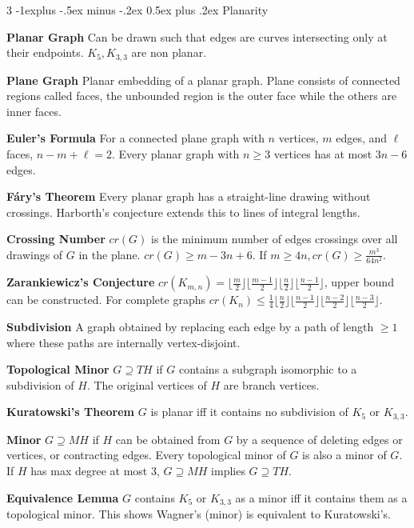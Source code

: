 \documentclass[10pt, landscape]{article}
\makeatletter
\renewcommand{\section}{\@startsection{section}{1}{0mm}%
                                {-1ex plus -.5ex minus -.2ex}%
                                {0.5ex plus .2ex}%
                                {\normalfont\large\bfseries}}
\renewcommand{\section}{\@startsection{section}{2}{0mm}%
                                {-1explus -.5ex minus -.2ex}%
                                {0.5ex plus .2ex}%
                                {\normalfont\normalsize\bfseries}}
\makeatother
\begin{document}
\begin{multicols*}{3}
\section{Planarity}

\textbf{Planar Graph} Can be drawn such that edges are curves intersecting only at their endpoints. $K_5, K_{3,3}$ are non planar.

\textbf{Plane Graph} Planar embedding of a planar graph. Plane consists of connected regions called faces, the unbounded region is the outer face while the others are inner faces.

\textbf{Euler's Formula} For a connected plane graph with $n$ vertices, $m$ edges, and $\ell$ faces, $n-m+\ell=2$. Every planar graph with $n \geq 3$ vertices has at most $3n-6$ edges.

\textbf{Fáry's Theorem} Every planar graph has a straight-line drawing without crossings. Harborth's conjecture extends this to lines of integral lengths.

\textbf{Crossing Number} $cr(G)$ is the minimum number of edges crossings over all drawings of $G$ in the plane. $cr(G) \geq m-3n+6$. If $m \geq 4n, cr(G) \geq \frac{m^3}{64n^2}$.

\textbf{Zarankiewicz's Conjecture} $cr(K_{m,n})=\lfloor \frac{m}{2}\rfloor \lfloor \frac{m-1}{2}\rfloor \lfloor \frac{n}{2}\rfloor \lfloor\frac{n-1}{2}\rfloor$, upper bound can be constructed. For complete graphs $cr(K_n) \leq \frac{1}{4} \lfloor \frac{n}{2} \rfloor \lfloor \frac{n-1}{2} \rfloor \lfloor \frac{n-2}{2} \rfloor \lfloor \frac{n-3}{2} \rfloor$.

\textbf{Subdivision} A graph obtained by replacing each edge by a path of length $\geq 1$ where these paths are internally vertex-disjoint.

\textbf{Topological Minor} $G \supseteq TH$ if $G$ contains a subgraph isomorphic to a subdivision of $H$. The original vertices of $H$ are branch vertices.

\textbf{Kuratowski's Theorem} $G$ is planar iff it contains no subdivision of $K_5$ or $K_{3,3}$.

\textbf{Minor} $G \supseteq MH$ if $H$ can be obtained from $G$ by a sequence of deleting edges or vertices, or contracting edges. Every topological minor of $G$ is also a minor of $G$. If $H$ has max degree at most 3, $G \supseteq MH$ implies $G \supseteq TH$.

\textbf{Equivalence Lemma} $G$ contains $K_5$ or $K_{3,3}$ as a minor iff it contains them as a topological minor. This shows Wagner's (minor) is equivalent to Kuratowski's.


\end{multicols*}
\end{document}
